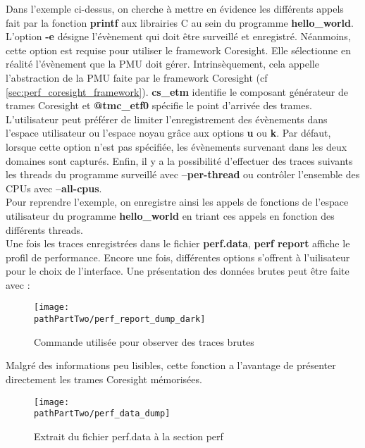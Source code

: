 Dans l'exemple ci-dessus, on cherche à mettre en évidence les différents
appels fait par la fonction \textbf{printf} aux librairies C au sein du
programme \textbf{hello\_world}. L'option \textbf{-e} désigne l'évènement qui
doit être surveillé et enregistré. Néanmoins, cette option est requise pour
utiliser le framework Coresight. Elle sélectionne en réalité l'évènement que
la PMU doit gérer.  Intrinsèquement, cela appelle l'abstraction de la PMU
faite par le framework Coresight (cf \ref{sec:perf_coresight_framework}).
\textbf{cs\_etm} identifie le composant générateur de trames Coresight et
\textbf{@tmc\_etf0} spécifie le point d'arrivée des trames. L'utilisateur peut
préférer de limiter l'enregistrement des évènements dans l'espace utilisateur
ou l'espace noyau grâce aux options \textbf{u} ou \textbf{k}. Par défaut,
lorsque cette option n'est pas spécifiée, les évènements survenant dans les
deux domaines sont capturés.  Enfin, il y a la possibilité d'effectuer des
traces suivants les threads du programme surveillé avec \textbf{--per-thread}
ou contrôler l'ensemble des CPUs avec \textbf{--all-cpus}. \\

Pour reprendre l'exemple, on enregistre ainsi les appels de fonctions de
l'espace utilisateur du programme \textbf{hello\_world} en triant ces appels
en fonction des différents threads. \\

Une fois les traces enregistrées dans le fichier \textbf{perf.data},
\textbf{perf report} affiche le profil de performance. Encore une fois,
différentes options s'offrent à l'uilisateur pour le choix de l'interface. Une
présentation des données brutes peut être faite avec :

\begin{figure}[H]
	\begin{center}
		\texttt{[image: \\pathPartTwo/perf\_report\_dump\_dark]}
		\caption{Commande utilisée pour observer des traces brutes}
            \label{cmd:perf_report_dump}
	\end{center}
\end{figure}

Malgré des informations peu lisibles, cette fonction a l'avantage de présenter
directement les trames Coresight mémorisées. \\

\begin{figure}[H]
	\begin{center}
		\texttt{[image: \\pathPartTwo/perf\_data\_dump]}
		\caption{Extrait du fichier perf.data à la section perf}
	    \label{fig:perf_data_dump}
	\end{center}
\end{figure}

